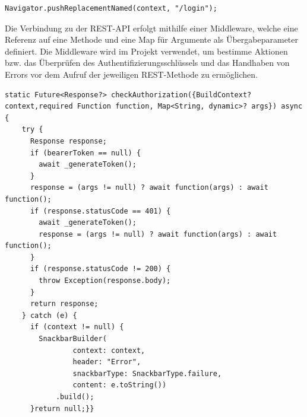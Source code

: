 \begin{lstlisting}[caption=Wechseln auf die Login Seite mithilfe des /login Schlüssels,style=goMono]
Navigator.pushReplacementNamed(context, "/login");
\end{lstlisting}
\label{subsec:impl:apimiddleware}
Die Verbindung zu der REST-API erfolgt mithilfe einer Middleware, welche eine Referenz auf eine Methode und eine Map für Argumente als Übergabeparameter definiert. Die Middleware wird im Projekt verwendet, um bestimme Aktionen bzw. das Überprüfen des Authentifizierungsschlüssels und das Handhaben von Errors vor dem Aufruf der jeweiligen REST-Methode zu ermöglichen.\newpage
\begin{lstlisting}[caption=Middleware zum überprüfen des Tokens vor dem Methoden Aufruf,style=goMono]
static Future<Response?> checkAuthorization({BuildContext? context,required Function function, Map<String, dynamic>? args}) async {
    try {
      Response response;
      if (bearerToken == null) {
        await _generateToken();
      }
      response = (args != null) ? await function(args) : await function();
      if (response.statusCode == 401) {
        await _generateToken();
        response = (args != null) ? await function(args) : await function();
      }
      if (response.statusCode != 200) {
        throw Exception(response.body);
      }
      return response;
    } catch (e) {
      if (context != null) {
        SnackbarBuilder(
                context: context,
                header: "Error",
                snackbarType: SnackbarType.failure,
                content: e.toString())
            .build();
      }return null;}}
\end{lstlisting}

